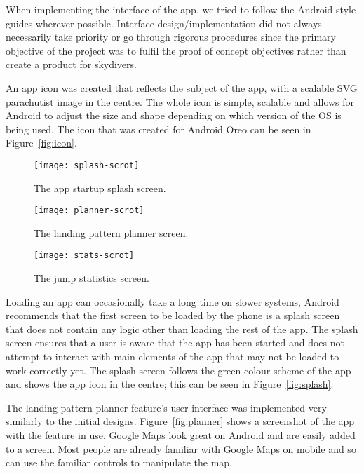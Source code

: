 When implementing the interface of the app, we tried to follow the Android style guides wherever possible. Interface design/implementation did not always necessarily take priority or go through rigorous procedures since the primary objective of the project was to fulfil the proof of concept objectives rather than create a product for skydivers.

An app icon was created that reflects the subject of the app, with a scalable SVG parachutist image in the centre. The whole icon is simple, scalable and allows for Android to adjust the size and shape depending on which version of the OS is being used. The icon that was created for Android Oreo can be seen in Figure~\vref{fig:icon}.

\begin{figure}[h]
  \centering
  \captionsetup{width=0.24\textwidth}
  \begin{minipage}[b]{0.25\textwidth}
    \texttt{[image: splash-scrot]}
    \caption{The app startup splash screen.}\label{fig:splash}
  \end{minipage}%
  \hspace{1.5cm}
  \begin{minipage}[b]{0.25\textwidth}
    \texttt{[image: planner-scrot]}
    \caption{The landing pattern planner screen.}\label{fig:planner}
  \end{minipage}%
  \hspace{1.5cm}
  \begin{minipage}[b]{0.25\textwidth}
    \texttt{[image: stats-scrot]}
    \caption{The jump statistics screen.}\label{fig:stats}
  \end{minipage}
\end{figure}

Loading an app can occasionally take a long time on slower systems, Android recommends that the first screen to be loaded by the phone is a splash screen that does not contain any logic other than loading the rest of the app. The splash screen ensures that a user is aware that the app has been started and does not attempt to interact with main elements of the app that may not be loaded to work correctly yet. The splash screen follows the green colour scheme of the app and shows the app icon in the centre; this can be seen in Figure~\vref{fig:splash}.

The landing pattern planner feature's user interface was implemented very similarly to the initial designs. Figure~\vref{fig:planner} shows a screenshot of the app with the feature in use. Google Maps look great on Android and are easily added to a screen. Most people are already familiar with Google Maps on mobile and so can use the familiar controls to manipulate the map.

